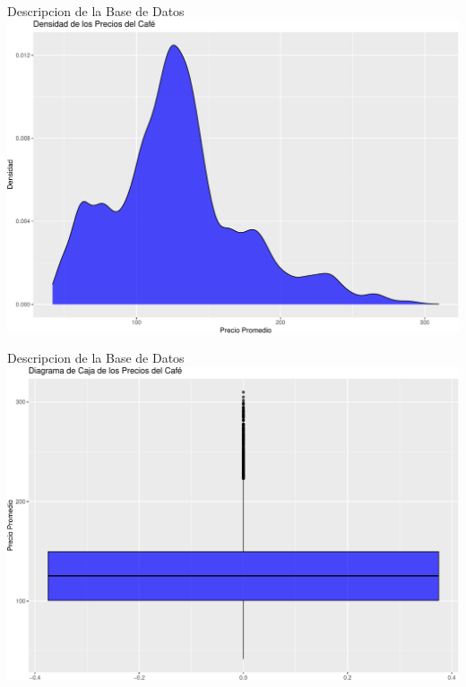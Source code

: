 \documentclass[
  10pt,
  ignorenonframetext,
  aspectratio=1612]{beamer}
\begin{document}
\begin{frame}{Descripcion de la Base de Datos}
\label{descripcion-de-la-base-de-datos-4}
\includegraphics{Informe_files/figure-beamer/unnamed-chunk-3-1.pdf}
\end{frame}

\begin{frame}{Descripcion de la Base de Datos}
\label{descripcion-de-la-base-de-datos-5}
\includegraphics{Informe_files/figure-beamer/unnamed-chunk-4-1.pdf}
\end{frame}
\end{document}
